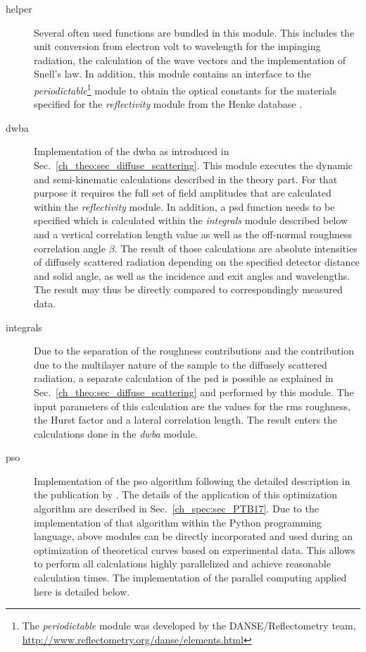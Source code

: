 \begin{description}
 \item[helper]{Several often used functions are bundled in this module. This includes the unit conversion from electron volt to wavelength for the impinging radiation, the calculation of the wave vectors and the implementation of Snell's law. In addition, this module contains an interface to the \emph{periodictable}\footnote{The \emph{periodictable} module was developed by the DANSE/Reflectometry team, \url{http://www.reflectometry.org/danse/elements.html}} module to obtain the optical constants for the materials specified for the \emph{reflectivity} module from the Henke database \cite{henke_x-ray_1993}.}
 
 \item[dwba]{Implementation of the \gls{dwba} as introduced in Sec.~\ref{ch_theo:sec_diffuse_scattering}. This module executes the dynamic and semi-kinematic calculations described in the theory part. For that purpose it requires the full set of field amplitudes that are calculated within the \emph{reflectivity} module. In addition, a \gls{psd} function needs to be specified which is calculated within the \emph{integrals} module described below and a vertical correlation length value as well as the off-normal roughness correlation angle $\beta$. The result of those calculations are absolute intensities of diffusely scattered radiation depending on the specified detector distance and solid angle, as well as the incidence and exit angles and wavelengths. The result may thus be directly compared to correspondingly measured data.}
 
 \item[integrals]{Due to the separation of the roughness contributions and the contribution due to the multilayer nature of the sample to the diffusely scattered radiation, a separate calculation of the \gls{psd} is possible as explained in Sec.~\ref{ch_theo:sec_diffuse_scattering} and performed by this module. The input parameters of this calculation are the values for the \gls{rms} roughness, the Hurst factor and a lateral correlation length. The result enters the calculations done in the \emph{dwba} module.}
 
 \item[pso]{Implementation of the \gls{pso} algorithm following the detailed description in the publication by \textcite{carlisle_off--shelf_2001}. The details of the application of this optimization algorithm are described in Sec.~\ref{ch_spec:sec_PTB17}. Due to the implementation of that algorithm within the Python programming language, above modules can be directly incorporated and used during an optimization of theoretical curves based on experimental data. This allows to perform all calculations highly parallelized and achieve reasonable calculation times. The implementation of the parallel computing applied here is detailed below.}
 

\end{description}
